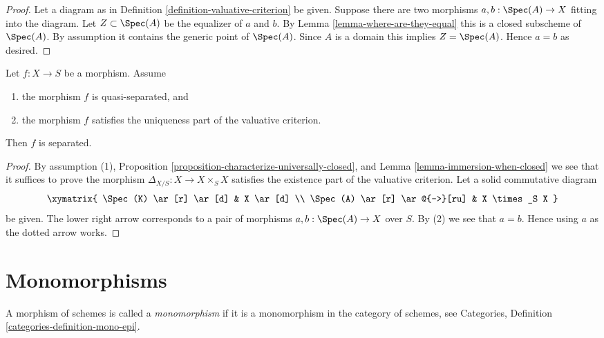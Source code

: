 \begin{proof}
Let a diagram as in Definition \ref{definition-valuative-criterion}
be given. Suppose there are two morphisms
$a, b : \Spec(A) \to X$ fitting into the diagram.
Let $Z \subset \Spec(A)$ be the equalizer of $a$ and $b$.
By Lemma \ref{lemma-where-are-they-equal} this is a closed
subscheme of $\Spec(A)$. By assumption it contains
the generic point of $\Spec(A)$. Since $A$ is a domain
this implies $Z = \Spec(A)$. Hence $a = b$ as desired.
\end{proof}

\begin{lemma}
\label{lemma-valuative-criterion-separatedness}
\begin{reference}
\cite[II Proposition 7.2.3]{EGA}
\end{reference}
Let $f : X \to S$ be a morphism.
Assume
\begin{enumerate}
\item the morphism $f$ is quasi-separated, and
\item the morphism $f$ satisfies the uniqueness
part of the valuative criterion.
\end{enumerate}
Then $f$ is separated.
\end{lemma}

\begin{proof}
By assumption (1),
Proposition \ref{proposition-characterize-universally-closed},
and Lemma \ref{lemma-immersion-when-closed}
we see that it suffices to prove the morphism
$\Delta_{X/S} : X \to X \times_S X$ satisfies the existence
part of the valuative criterion.
Let a solid commutative diagram
$$
\xymatrix{
\Spec(K) \ar[r] \ar[d] & X \ar[d] \\
\Spec(A) \ar[r] \ar@{-->}[ru] & X \times_S X
}
$$
be given. The lower right arrow corresponds to a
pair of morphisms $a, b : \Spec(A) \to X$ over $S$.
By (2) we see that $a = b$. Hence using $a$ as the dotted
arrow works.
\end{proof}





\section{Monomorphisms}
\label{section-monomorphisms}

\begin{definition}
\label{definition-monomorphism}
A morphism of schemes is called a {\it monomorphism} if it is
a monomorphism in the category of schemes, see
Categories, Definition \ref{categories-definition-mono-epi}.
\end{definition}

